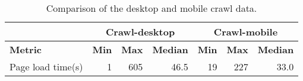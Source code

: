 \begin{table}[ht] 
\caption{Comparison of the desktop and mobile crawl data.} 
\centering 
\begin{tabular}{|l|rrl|lll|} 
\hline 
\textbf{} & \multicolumn{3}{c|}{\textbf{Crawl-desktop}} & \multicolumn{3}{c|}{\textbf{Crawl-mobile}} \\ \hline 
\textbf{Metric} & \multicolumn{1}{r|}{\textbf{Min}} & \multicolumn{1}{r|}{\textbf{Max}} & \textbf{Median} & \multicolumn{1}{l|}{\textbf{Min}} & \multicolumn{1}{l|}{\textbf{Max}} & \textbf{Median} \\ \hline 
Page load time(s) & \multicolumn{1}{r|}{1} & \multicolumn{1}{r|}{605} & \multicolumn{1}{r|}{46.5} & \multicolumn{1}{r|}{19} & \multicolumn{1}{r|}{227} & \multicolumn{1}{r|}{33.0} \\ \hline 
\end{tabular} 
\label{table:Comparison} 
\end{table}